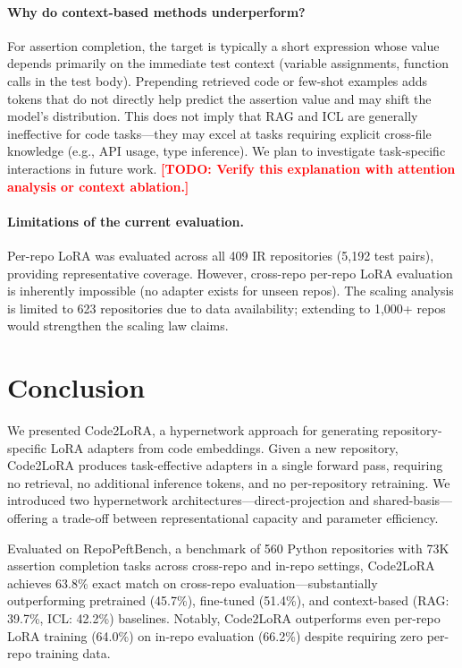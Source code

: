 \documentclass[11pt]{article}
\newcommand{\method}{Code2LoRA}
\newcommand{\benchmark}{RepoPeftBench}
\newcommand{\todo}[1]{\textcolor{red}{\textbf{[TODO: #1]}}}
\begin{document}
\paragraph{Why do context-based methods underperform?}
For assertion completion, the target is typically a short expression whose value depends primarily on the immediate test context (variable assignments, function calls in the test body).
Prepending retrieved code or few-shot examples adds tokens that do not directly help predict the assertion value and may shift the model's distribution.
This does not imply that RAG and ICL are generally ineffective for code tasks---they may excel at tasks requiring explicit cross-file knowledge (e.g., API usage, type inference).
We plan to investigate task-specific interactions in future work.
\todo{Verify this explanation with attention analysis or context ablation.}

\paragraph{Limitations of the current evaluation.}
Per-repo LoRA was evaluated across all 409 IR repositories (5,192 test pairs), providing representative coverage.
However, cross-repo per-repo LoRA evaluation is inherently impossible (no adapter exists for unseen repos).
The scaling analysis is limited to 623 repositories due to data availability; extending to 1,000+ repos would strengthen the scaling law claims.

\section{Conclusion}
\label{sec:conclusion}

We presented \method{}, a hypernetwork approach for generating repository-specific LoRA adapters from code embeddings.
Given a new repository, \method{} produces task-effective adapters in a single forward pass, requiring no retrieval, no additional inference tokens, and no per-repository retraining.
We introduced two hypernetwork architectures---direct-projection and shared-basis---offering a trade-off between representational capacity and parameter efficiency.

Evaluated on \benchmark{}, a benchmark of 560 Python repositories with 73K assertion completion tasks across cross-repo and in-repo settings, \method{} achieves 63.8\% exact match on cross-repo evaluation---substantially outperforming pretrained (45.7\%), fine-tuned (51.4\%), and context-based (RAG: 39.7\%, ICL: 42.2\%) baselines.
Notably, \method{} outperforms even per-repo LoRA training (64.0\%) on in-repo evaluation (66.2\%) despite requiring zero per-repo training data.
\end{document}
